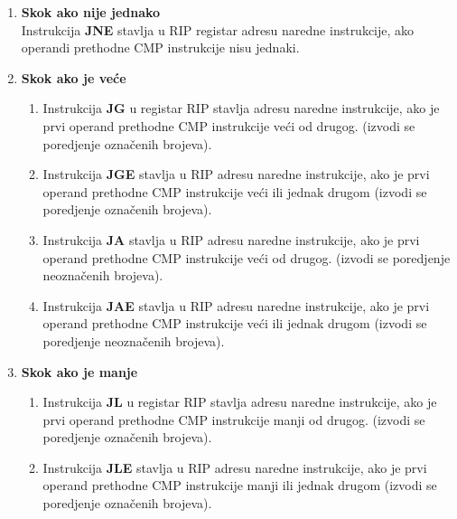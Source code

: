 \documentclass[a4paper]{article}
\begin{document}
\begin{enumerate}
\begin{enumerate}
\item{\textbf{Skok ako nije jednako}}\\
	Instrukcija \textbf{JNE} stavlja u RIP registar adresu naredne instrukcije, ako operandi prethodne CMP instrukcije nisu jednaki. \\

\item{\textbf{Skok ako je ve\' ce}}\\
	\begin{enumerate}
	 \item{Instrukcija \textbf{JG} u registar RIP stavlja adresu naredne instrukcije, ako je prvi operand prethodne CMP instrukcije ve\' ci od drugog.
	(izvodi se poredjenje ozna\v cenih brojeva).}\\
	
	\item {Instrukcija \textbf{JGE} stavlja u RIP adresu naredne instrukcije, ako je prvi operand prethodne CMP instrukcije ve\' ci ili jednak drugom
	(izvodi se poredjenje ozna\v cenih brojeva).}\\

	\item {Instrukcija \textbf{JA} stavlja u RIP adresu naredne instrukcije, ako je prvi operand prethodne CMP instrukcije ve\' ci od drugog.
	(izvodi se poredjenje neozna\v cenih brojeva).}\\

	\item {Instrukcija \textbf{JAE} stavlja u RIP adresu naredne instrukcije, ako je prvi operand prethodne CMP instrukcije ve\' ci ili jednak drugom
	(izvodi se poredjenje neozna\v cenih brojeva).}\\
	\end{enumerate}%

\item{\textbf{Skok ako je manje}}
	\begin{enumerate}
	\item{Instrukcija \textbf{JL} u registar RIP stavlja adresu naredne instrukcije, ako je prvi operand prethodne CMP instrukcije manji od drugog.
	(izvodi se poredjenje ozna\v cenih brojeva).}\\
	
	\item{Instrukcija \textbf{JLE} stavlja u RIP adresu naredne instrukcije, ako je prvi operand prethodne CMP instrukcije manji ili jednak drugom
	(izvodi se poredjenje ozna\v cenih brojeva).}\\


\end{enumerate}
\end{enumerate}
\end{enumerate}
\end{document}
